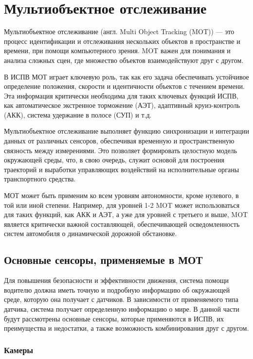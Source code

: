 \section{Мультиобъектное отслеживание}\label{sec::mot}

Мультиобъектное отслеживание (англ. Multi Object Tracking (MOT)) — это процесс идентификации и отслеживания нескольких объектов в пространстве и времени, при помощи компьютерного зрения. MOT важен для понимания и анализа сложных сцен, где множество объектов взаимодействуют друг с другом.

В ИСПВ МОТ играет ключевую роль, так как его задача обеспечивать устойчивое определение положения, скорости и идентичности объектов с течением времени. Эта информация критически необходима для таких ключевых функций ИСПВ, как автоматическое экстренное торможение (АЭТ), адаптивный круиз-контроль (АКК), система удержание в полосе (СУП) и т.д.

Мультиобъектное отслеживание выполняет функцию синхронизации и интеграции данных от различных сенсоров, обеспечивая временную и пространственную связность между измерениями. Это позволяет формировать целостную модель окружающей среды, что, в свою очередь, служит основой для построения траекторий и выработки управляющих воздействий на исполнительные органы транспортного средства.

МОТ может быть применим ко всем уровням автономности, кроме нулевого, в той или иной степени. Например, для уровней 1-2 MOT может использоваться для таких функций, как АКК и АЭТ, а уже для уровней с третьего и выше, MOT является критически важной составляющей, обеспечивающей осведомленность систем автомобиля о динамической дорожной обстановке.

\subsection{Основные сенсоры, применяемые в МОТ}\label{subsec:sensors}

Для повышения безопасности и эффективности движения, система помощи водителю должна иметь точную и подробную информацию об окружающей среде, которую она получает с датчиков. В зависимости от применяемого типа датчика, система получает определенную информацию о мире. В данной части будут рассмотрены основные сенсоры, которые применяются в ИСПВ, их преимущества и недостатки, а также возможность комбинирования друг с другом.

\subsubsection{Камеры}

